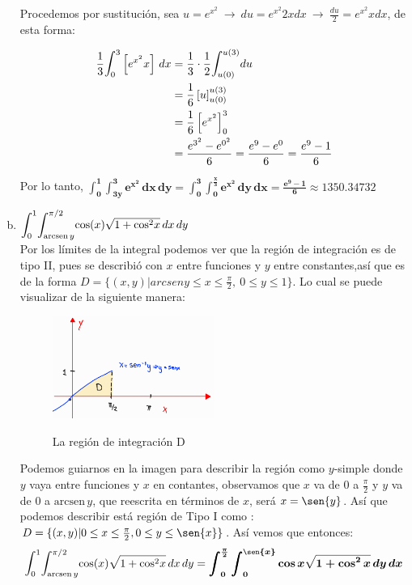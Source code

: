 \documentclass[12pt]{exam}
\begin{document}
\begin{questions}
\begin{enumerate}[a)]
 Procedemos por sustitución, sea $u = e^{x^{2}} ~ \rightarrow ~ du =  e^{x^{2}} 2xdx ~ \rightarrow ~ \frac{du}{2} = e^{x^{2}} xdx $, de esta forma:

\begin{align*}
  \frac{1}{3} \mathlarger{\int}_0^3\left[  e^{x^2}x  \right] \,dx
  &=  \frac{1}{3} \cdot  \frac{1}{2}  \mathlarger{\int}_{u(0)}^{u(3)}du \\
  &= \frac{1}{6} \left[ u \right]_{u(0)}^{u(3)} \\
  &= \frac{1}{6} \left[  e^{x^{2}} \right]_{0}^{3} \\
   &= \frac{ e^{3^{2}}  -  e^{0^{2}} }{6}  = \frac{ e^9  -  e^{0} }{6} =   \frac{ e^9  -  1 }{6}  \\
\end{align*}

Por lo tanto, $\boldsymbol{ \int_0^1\int_{3y}^3 e^{x^2}\,dx\,dy =   \int_0^3\int_{0}^{\frac{x}{3}} e^{x^2}\,dy\,dx = \frac{ e^9  -  1 }{6} \approx 1350.34732}$
\item $\mathlarger{\int}_0^1\mathlarger{\int}_{\text{arcsen}\,y}^{\pi/2}\text{cos}(x)\sqrt{1+\text{cos}^2x}\,dx\,dy$ \\
  Por los límites de la integral podemos ver que la región de integración es de tipo II, pues se describió con $x$ entre funciones y $y$ entre constantes,así que es de la forma $D = \{ (x,y)| arcseny \leq x \leq \frac{\pi}{2} ,  ~ 0 \leq y \leq 1 \}$. Lo cual se puede visualizar de la siguiente manera:

 \begin{figure}[h]
      \centering
      \includegraphics[width=0.5\textwidth]{./img/i2e6.png}
      \label{fig:región}
      \caption{La región de integración D}
 \end{figure}

 Podemos guiarnos en la imagen para describir la región como $y$-simple donde $y$ vaya entre funciones y $ x$ en contantes, observamos que $x$ va de $ 0 $ a $\frac{\pi}{2}$ y $y$ va de 0 a $\text{arcsen}\,y$, que reescrita en términos de $x$, será $x = \sen{y}$. Así que podemos describir está región de Tipo I como :  $D= \{(x,y)| 0 \leq x \leq \frac{\pi}{2}, 0 \leq y \leq \sen{x} \}$. Así vemos que entonces:
 \[
 \mathlarger{\int}_0^1\mathlarger{\int}_{\text{arcsen}\,y}^{\pi/2}\text{cos}(x)\sqrt{1+\text{cos}^2x}\,dx\,dy   = \boldsymbol{\int_0^{\frac{\pi}{2}}\int_{0}^{\sen{x}} \cos{x}\sqrt{1+\cos^2{x}} \,dy\,dx}
 \]


\end{enumerate}
\end{questions}
\end{document}
